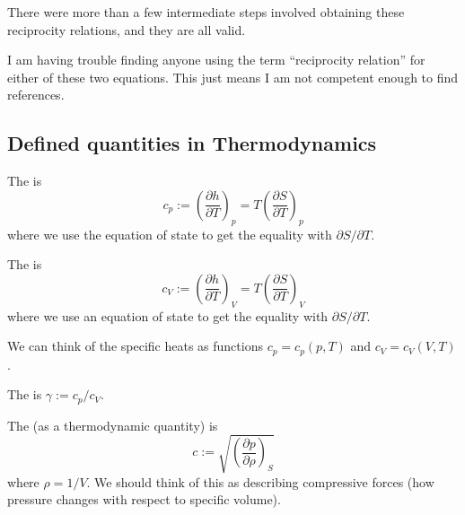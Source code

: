 \begin{remark}
There were more than a few intermediate steps involved obtaining these
reciprocity relations, and they are all valid.
\end{remark}

\begin{remark}
I am having trouble finding anyone using the term ``reciprocity relation''
for either of these two equations. This just means I am not competent
enough to find references.
\end{remark}

\subsection{Defined quantities in Thermodynamics}

\begin{definition}
The  is
\begin{equation*}
c_{p} := \left(\frac{\partial h}{\partial T}\right)_{p} = T\left(\frac{\partial S}{\partial T}\right)_{p}
\end{equation*}
where we use the equation of state to get the equality with $\partial S/\partial T$.
\end{definition}

\begin{definition}\label{def:specific-heat-at-constant-volume}
The  is
\begin{equation*}
c_{V} := \left(\frac{\partial h}{\partial T}\right)_{V} = T\left(\frac{\partial S}{\partial T}\right)_{V}
\end{equation*}
where we use an equation of state to get the equality with $\partial S/\partial T$.
\end{definition}

\begin{remark}
We can think of the specific heats as functions $c_{p}=c_{p}(p,T)$ and $c_{V}=c_{V}(V,T)$.
\end{remark}

\begin{definition}
The  is $\gamma := c_{p}/c_{V}$.
\end{definition}

\begin{definition}
The  (as a thermodynamic quantity) is
\begin{equation*}
c := \sqrt{\left(\frac{\partial p}{\partial \rho}\right)_{S}}
\end{equation*}
where $\rho=1/V$. We should think of this as describing compressive
forces (how pressure changes with respect to specific volume).
\end{definition}

